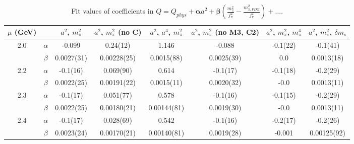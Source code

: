 \documentclass[12pt]{extarticle}
\begin{document}
\begin{table}[h!]
\begin{center}
\begin{tabular}{|c c|c|c|c|c|c|c|}
\hline
$\mu$ (GeV) &  & $a^2$, $m_\pi^2$& $a^2$, $m_\pi^2$ (no C)& $a^2$, $a^4$, $m_\pi^2$& $a^2$, $m_\pi^2$ (no M3, C2)& $a^2$, $m_\pi^2$, $m_\pi^4$& $a^2$, $m_\pi^2$, $\delta m_s$\\
\hline
\multirow{2}{0.5in}{2.0} & $\alpha$ & -0.099& 0.24(12)& 1.146& -0.088& -0.1(22)& -0.1(41)\\
 & $\beta$ & 0.0027(31)& 0.00228(25)& 0.0015(88)& 0.0025(39)& 0.0& 0.0013(18)\\
\hline
\multirow{2}{0.5in}{2.2} & $\alpha$ & -0.1(16)& 0.069(90)& 0.614& -0.1(17)& -0.1(18)& -0.2(29)\\
 & $\beta$ & 0.0022(25)& 0.00191(22)& 0.0015(11)& 0.0020(32)& -0.0& 0.0013(11)\\
\hline
\multirow{2}{0.5in}{2.3} & $\alpha$ & -0.1(17)& 0.051(77)& 0.578& -0.1(16)& -0.1(15)& -0.2(29)\\
 & $\beta$ & 0.0022(25)& 0.00180(21)& 0.00144(81)& 0.0019(30)& -0.0& 0.0013(11)\\
\hline
\multirow{2}{0.5in}{2.4} & $\alpha$ & -0.1(17)& 0.028(69)& 0.542& -0.1(16)& -0.2(17)& -0.2(26)\\
 & $\beta$ & 0.0023(24)& 0.00170(21)& 0.00140(81)& 0.0019(28)& -0.001& 0.00125(92)\\
\hline
\end{tabular}
\caption{Fit values of coefficients in $Q = Q_{phys} + \mathbf{\alpha} a^2 + \mathbf{\beta}\left(\frac{m_\pi^2}{f_\pi^2}-\frac{m_{\pi,PDG}^2}{f_\pi^2}\right) + \ldots$.}
\end{center}
\end{table}
























\clearpage
\end{document}
